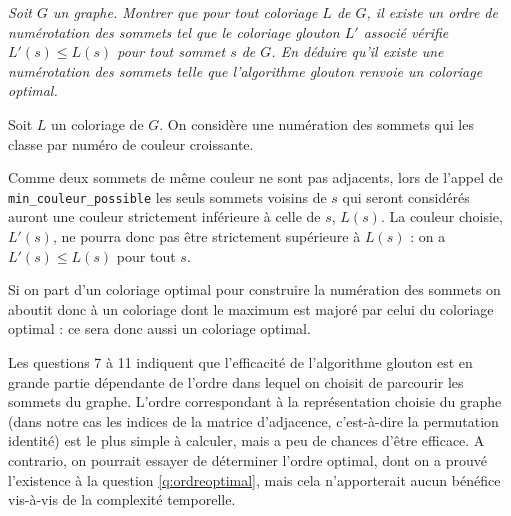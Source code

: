 \begin{Exercise} [label=q:ordreoptimal]\it 
Soit $G$ un graphe. Montrer que pour tout coloriage $L$ de $G$, il existe un ordre de numérotation des sommets tel que le coloriage glouton $L'$ associé vérifie $L'(s) \leq L(s)$ pour tout sommet $s$ de $G$. En déduire qu'il existe une numérotation des sommets telle que l'algorithme glouton renvoie un coloriage optimal. 
\end{Exercise}  
\begin{Answer}
Soit $L$ un coloriage de $G$. On considère une numération des sommets qui les classe par numéro de couleur croissante.

Comme deux sommets de même couleur ne sont pas adjacents, lors de l'appel de \texttt{min\_couleur\_possible} les seuls sommets voisins de $s$ qui seront considérés auront une couleur strictement inférieure à celle de $s$, $L(s)$. La couleur choisie, $L'(s)$, ne pourra donc pas être strictement supérieure à $L(s)$ : on a $L'(s) \le L(s)$ pour tout $s$.

Si on part d'un coloriage optimal pour construire la numération des sommets on aboutit donc à un coloriage dont le maximum est majoré par celui du coloriage optimal : ce sera donc aussi un coloriage optimal.
\end{Answer}
Les questions 7 à 11 indiquent que l'efficacité de l'algorithme glouton est en grande partie dépendante de l'ordre dans lequel on choisit de parcourir les sommets du graphe. L'ordre correspondant à la représentation choisie du graphe (dans notre cas les indices de la matrice d'adjacence, c'est-à-dire la permutation identité) est le plus simple à calculer, mais a peu de chances d'être efficace. A contrario, on pourrait essayer de déterminer l'ordre optimal, dont on a prouvé l'existence à la question \ref{q:ordreoptimal}, mais cela n'apporterait aucun bénéfice vis-à-vis de la complexité temporelle.

